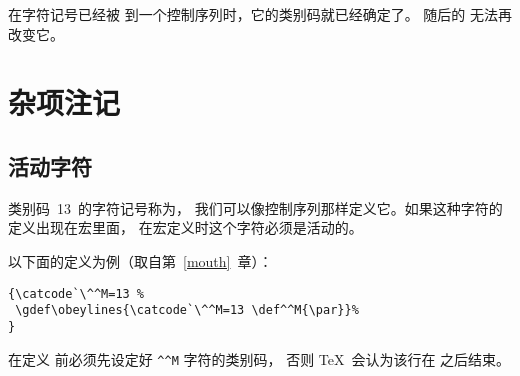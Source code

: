 \documentclass{book}
\begin{document}
在字符记号已经被  到一个控制序列时，它的类别码就已经确定了。
随后的  无法再改变它。

\section{杂项注记}

\subsection{活动字符}

类别码~13~的字符记号称为，
我们可以像控制序列那样定义它。如果这种字符的定义出现在宏里面，
在宏定义时这个字符必须是活动的。

以下面的定义为例（取自第~\ref{mouth}~章）：
\begin{verbatim}
{\catcode`\^^M=13 %
 \gdef\obeylines{\catcode`\^^M=13 \def^^M{\par}}%
}
\end{verbatim}
在定义  前必须先设定好 \verb>^^M> 字符的类别码，
否则 \TeX\ 会认为该行在  之后结束。
\end{document}
